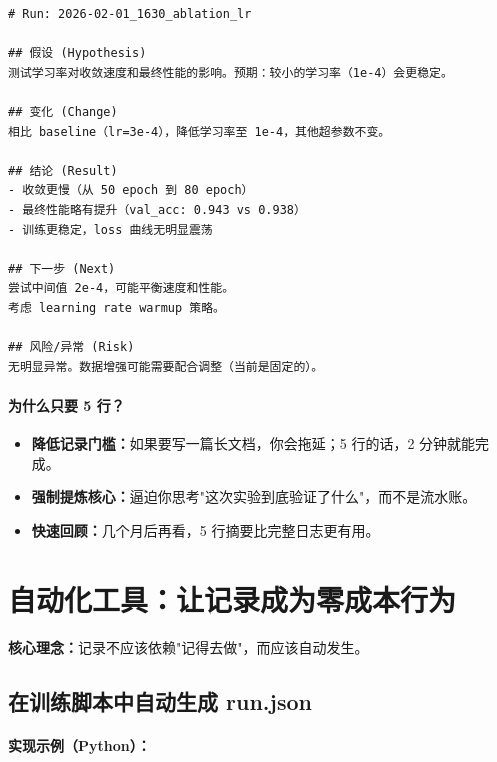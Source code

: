 \begin{verbatim}
# Run: 2026-02-01_1630_ablation_lr

## 假设 (Hypothesis)
测试学习率对收敛速度和最终性能的影响。预期：较小的学习率（1e-4）会更稳定。

## 变化 (Change)
相比 baseline（lr=3e-4），降低学习率至 1e-4，其他超参数不变。

## 结论 (Result)
- 收敛更慢（从 50 epoch 到 80 epoch）
- 最终性能略有提升（val_acc: 0.943 vs 0.938）
- 训练更稳定，loss 曲线无明显震荡

## 下一步 (Next)
尝试中间值 2e-4，可能平衡速度和性能。
考虑 learning rate warmup 策略。

## 风险/异常 (Risk)
无明显异常。数据增强可能需要配合调整（当前是固定的）。
\end{verbatim}

\paragraph{为什么只要 5 行？}

\begin{itemize}
  \item \textbf{降低记录门槛：}如果要写一篇长文档，你会拖延；5 行的话，2 分钟就能完成。
  \item \textbf{强制提炼核心：}逼迫你思考"这次实验到底验证了什么"，而不是流水账。
  \item \textbf{快速回顾：}几个月后再看，5 行摘要比完整日志更有用。
\end{itemize}

\section{自动化工具：让记录成为零成本行为}

\textbf{核心理念：}记录不应该依赖"记得去做"，而应该自动发生。

\subsection{在训练脚本中自动生成 run.json}

\paragraph{实现示例（Python）：}

